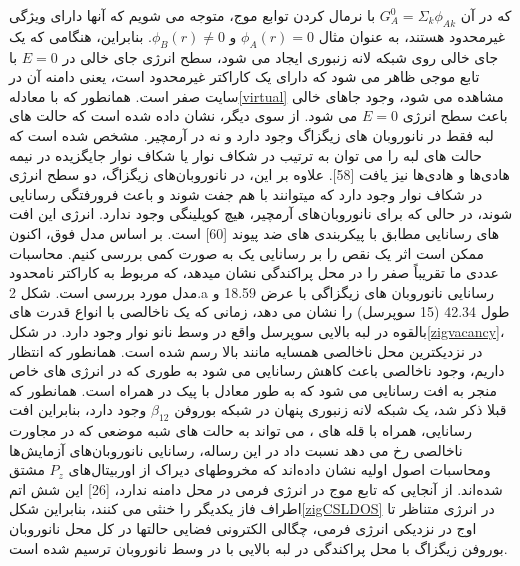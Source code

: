 که در آن $G^0_A =\Sigma_k \phi_{Ak}$ با نرمال کردن توابع موج، متوجه می شویم که آنها دارای ویژگی غیرمحدود هستند، به عنوان مثال $\phi_{A}(r) = 0$ و $\phi_{B}(r)\neq 0$. بنابراین، هنگامی که یک جای خالی روی شبکه لانه زنبوری ایجاد می شود، سطح انرژی جای خالی در $E = 0$ با تابع موجی ظاهر می شود که دارای یک کاراکتر غیرمحدود است، یعنی دامنه آن در سایت  صفر است. همانطور که با معادله\ref{virtual} مشاهده می شود، وجود جاهای خالی باعث سطح انرژی $E = 0$ می شود. از سوی دیگر، نشان داده شده است که حالت های لبه فقط در نانوروبان های زیگزاگ وجود دارد و نه در آرمچیر. مشخص شده است که حالت های لبه را می توان به ترتیب در شکاف نوار یا شکاف نوار جایگزیده در نیمه هادی‌ها و هادی‌ها نیز یافت [58]. علاوه بر این، در نانوروبان‌های زیگزاگ، دو سطح انرژی در شکاف نوار وجود دارد که میتوانند با هم جفت شوند و باعث فرورفتگی رسانایی شوند، در حالی که برای نانوروبان‌های آرمچیر، هیچ کوپلینگی وجود ندارد. انرژی این افت های رسانایی مطابق با پیکربندی های ضد پیوند [60] است. بر اساس مدل فوق، اکنون ممکن است اثر یک نقص را بر رسانایی یک  به صورت کمی بررسی کنیم. محاسبات عددی ما  تقریباً صفر را در محل پراکندگی نشان میدهد، که مربوط به کاراکتر نامحدود مدل مورد بررسی است. شکل 2.a رسانایی نانوروبان های زیگزاگی با عرض \lr{\AA} 18.59 و طول \lr{\AA}42.34 (15 سوپرسل) را نشان می دهد، زمانی که یک ناخالصی با انواع قدرت های بالقوه در لبه بالایی سوپرسل واقع در وسط نانو نوار وجود دارد. در شکل\ref{zigvacancy}،  در نزدیکترین محل ناخالصی همسایه مانند بالا رسم شده است. همانطور که انتظار داریم، وجود ناخالصی باعث کاهش رسانایی می شود به طوری که در انرژی های خاص منجر به افت رسانایی می شود که به طور معادل با پیک در  همراه است. همانطور که قبلا ذکر شد، یک شبکه لانه زنبوری پنهان در شبکه بوروفن $\beta_{12}$ وجود دارد، بنابراین افت رسانایی، همراه با قله های ، می تواند به حالت های شبه موضعی که در مجاورت ناخالصی رخ می دهد نسبت داد
در این رساله، رسانایی نانوروبان‌های 
آزمایش‌ها و\gls{محاسبات اصول اولیه} نشان داده‌اند که مخروطهای دیراک از اوربیتال‌های $P_z$ مشتق شده‌اند. از آنجایی که تابع موج در انرژی فرمی در محل  دامنه ندارد، [26] این شش اتم اطراف فاز یکدیگر را خنثی می کنند، بنابراین شکل\ref{zigCSLDOS} در انرژی متناظر تا اوج  در نزدیکی انرژی فرمی، چگالی الکترونی فضایی حالتها در کل محل نانوروبان بوروفن زیگزاگ با محل پراکندگی در لبه بالایی با  در وسط نانوروبان ترسیم شده است. 

